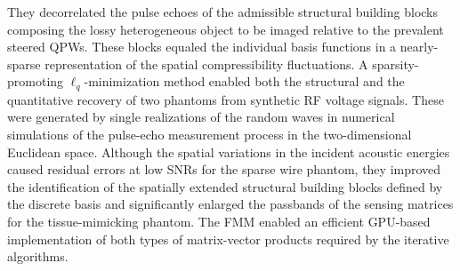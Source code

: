 They decorrelated
the pulse echoes of
the admissible structural building blocks composing
the lossy heterogeneous object to be imaged relative to
the prevalent steered \acp{QPW}.
These blocks equaled
the individual basis functions in
a nearly-sparse representation of
the spatial compressibility fluctuations.
A sparsity-promoting $\ell_{q}$-minimization method enabled both
the structural and
the quantitative recovery of
two phantoms from
synthetic \ac{RF} voltage signals.
These were generated by
single realizations of
the random waves in
numerical simulations of
the pulse-echo measurement process in
the two-dimensional Euclidean space.
Although
the spatial variations in
the incident acoustic energies caused
residual errors at
low \acp{SNR} for
the sparse wire phantom,
they improved
the identification of
the spatially extended structural building blocks defined by
the discrete  basis and significantly enlarged
the passbands of
the sensing matrices for
the tissue-mimicking phantom.
The \ac{FMM} enabled
an efficient \ac{GPU}-based implementation of
both types of
matrix-vector products required by
the iterative algorithms.

